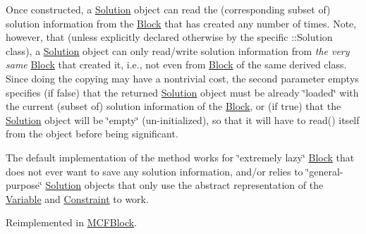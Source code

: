 Once constructed, a \mbox{\hyperlink{class_s_m_spp__di__unipi__it_1_1_solution}{Solution}} object can read the (corresponding subset of) solution information from the \mbox{\hyperlink{class_s_m_spp__di__unipi__it_1_1_block}{Block}} that has created any number of times. Note, however, that (unless explicitly declared otherwise by the specific \+::\+Solution class), a \mbox{\hyperlink{class_s_m_spp__di__unipi__it_1_1_solution}{Solution}} object can only read/write solution information from {\itshape the very same} \mbox{\hyperlink{class_s_m_spp__di__unipi__it_1_1_block}{Block}} that created it, i.\+e., not even from \mbox{\hyperlink{class_s_m_spp__di__unipi__it_1_1_block}{Block}} of the same derived class. Since doing the copying may have a nontrivial cost, the second parameter emptys specifies (if false) that the returned \mbox{\hyperlink{class_s_m_spp__di__unipi__it_1_1_solution}{Solution}} object must be already \char`\"{}loaded\char`\"{} with the current (subset of) solution information of the \mbox{\hyperlink{class_s_m_spp__di__unipi__it_1_1_block}{Block}}, or (if true) that the \mbox{\hyperlink{class_s_m_spp__di__unipi__it_1_1_solution}{Solution}} object will be \char`\"{}empty\char`\"{} (un-\/initialized), so that it will have to read() itself from the object before being significant.

The default implementation of the method works for \char`\"{}extremely lazy\char`\"{} \mbox{\hyperlink{class_s_m_spp__di__unipi__it_1_1_block}{Block}} that does not ever want to save any solution information, and/or relies to \char`\"{}general-\/purpose\char`\"{} \mbox{\hyperlink{class_s_m_spp__di__unipi__it_1_1_solution}{Solution}} objects that only use the abstract representation of the \mbox{\hyperlink{class_s_m_spp__di__unipi__it_1_1_variable}{Variable}} and \mbox{\hyperlink{class_s_m_spp__di__unipi__it_1_1_constraint}{Constraint}} to work. 

Reimplemented in \mbox{\hyperlink{class_s_m_spp__di__unipi__it_1_1_m_c_f_block_a55335e0e301e1bfa9592e8532bfd61e7}{M\+C\+F\+Block}}.

\mbox{\label{class_s_m_spp__di__unipi__it_1_1_block_a412a4ff2922e8d95f80589b1f6522d77}} 
